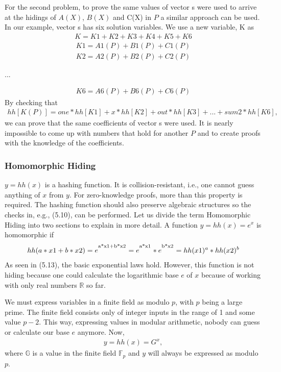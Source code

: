 For the second problem, to prove the same values of vector s were used to arrive at the hidings of \(A(X)\), \(B(X)\) and C(X) in \(P\) a similar approach can be used. In our example, vector s has six solution variables. We use a new variable, K as
\begin{align}
    K = K1 + K2 + K3 + K4 + K5 + K6
\end{align}
\begin{align*}
    K1 = A1(P) + B1(P) + C1(P)\\K2 = A2(P) + B2(P) + C2(P)
\end{align*}
\begin{center}
    ... \\
\end{center}
\begin{align*}
    K6 = A6(P) + B6(P) + C6(P)
\end{align*}
By checking that 
\begin{align}
    hh[K(P)] = one*hh[K1] + x * hh[K2] + out * hh[K3] + ... + sum2 * hh[K6],
\end{align}
we can prove that the same coefficients of vector s were used. It is nearly impossible to come up with numbers that hold for another \(P\) and to create proofs with the knowledge of the coefficients.

\subsubsection{Homomorphic Hiding}

\(y = hh(x)\) is a hashing function. It is collision-resistant, i.e., one cannot guess anything of \(x\) from \(y \). For zero-knowledge proofs, more than this property is required. The hashing function should also preserve algebraic structures so the checks in, e.g., (5.10), can be performed. Let us divide the term Homomorphic Hiding into two sections to explain in more detail.
A function \(y = hh(x) = e^x\) is homomorphic if
\begin{align}
    hh(a*x1 + b*x2) = e^\textsuperscript{a*x1+b*x2} = e^\textsuperscript{a*x1} * e^\textsuperscript{b*x2} = hh(x1)^a * hh(x2)^b
\end{align}
As seen in (5.13), the basic exponential laws hold. However, this function is not hiding because one could calculate the logarithmic base \(e\) of \(x\) because of working with only real numbers \begin{math}\mathbb{R}  
\end{math} so far.

We must express variables in a finite field as modulo \(p\), with \(p\) being a large prime. The finite field consists only of integer inputs in the range of 1 and some value \(p-2\). This way, expressing values in modular arithmetic, nobody can guess or calculate our base \(e\) anymore. Now,
\begin{align}
    y = hh(x) = G^x,
\end{align}
where \begin{math}\mathbb{G}\end{math} is a value in the finite field \begin{math}\mathbb{F}_p\end{math} and \(y\) will always be expressed as modulo \(p\).

